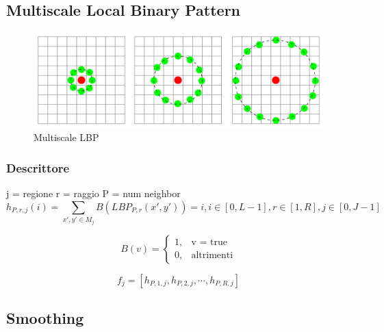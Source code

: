 \subsection{Multiscale Local Binary Pattern}





\begin{figure}[ht]
\begin{center}
\includegraphics[width=.95\textwidth]{img/raggio_LBP}
\caption{ Multiscale LBP }
\label{fig:MLBP}
\end{center}
\end{figure}

\subsubsection{Descrittore}

j = regione
r = raggio
P = num neighbor
\begin{equation}
h_{P,r,j}(i) = \sum_{x',y' \in M_j} B(LBP_{P,r}(x', y')) = i, i \in  [0, L-1 ], r \in [1, R], j \in [0, J-1]
\end{equation}

\begin{equation}
B(v) = 	\begin{cases} 1, & \mbox{v = true} \\ 0, & \mbox{altrimenti} \end{cases}
\end{equation}

\begin{equation}
f_{j} = [h_{P, 1, j}, h_{P, 2, j}, \cdots, h_{P, R, j}]
\end{equation}

\subsection{Smoothing}